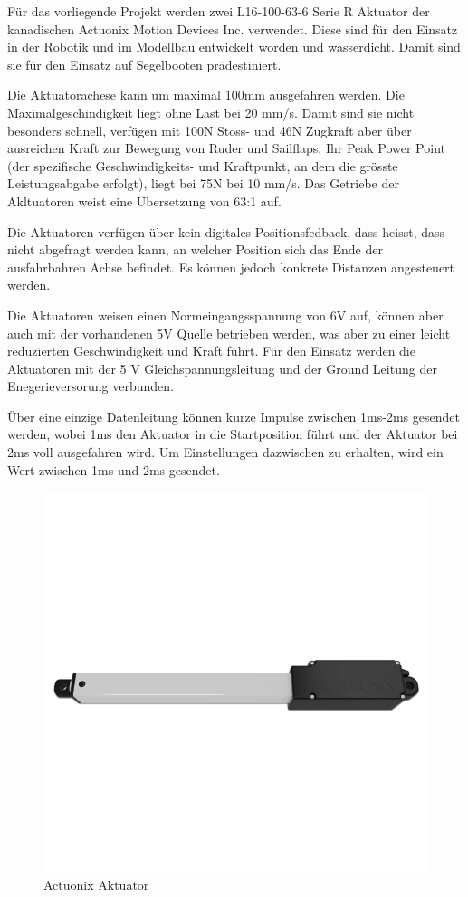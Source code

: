 Für das vorliegende Projekt werden zwei L16-100-63-6 Serie R Aktuator der kanadischen Actuonix Motion Devices Inc. verwendet. Diese sind für den Einsatz in der Robotik und im Modellbau entwickelt worden und wasserdicht. Damit sind  sie für den Einsatz  auf Segelbooten prädestiniert. 

Die Aktuatorachese kann um maximal 100mm ausgefahren werden. Die Maximalgeschindigkeit liegt ohne Last bei 20 mm/s. Damit sind sie nicht besonders schnell, verfügen mit 100N Stoss- und 46N Zugkraft aber über ausreichen Kraft zur Bewegung von Ruder und Sailflaps. Ihr Peak Power Point (der spezifische Geschwindigkeits- und Kraftpunkt, an dem die grösste Leistungsabgabe erfolgt), liegt bei 75N bei 10 mm/s. Das Getriebe der Akltuatoren weist eine Übersetzung von 63:1 auf. 

Die Aktuatoren verfügen über kein digitales Positionsfedback, dass heisst, dass nicht abgefragt werden kann, an welcher Position sich das Ende der ausfahrbahren Achse befindet. Es können jedoch konkrete Distanzen angesteuert werden. 

Die Aktuatoren weisen einen Normeingangsspannung von 6V auf, können aber auch mit der vorhandenen 5V Quelle betrieben werden, was aber zu einer leicht reduzierten Geschwindigkeit und Kraft führt. Für den Einsatz werden die Aktuatoren mit der  5 V Gleichspannungsleitung und der Ground Leitung der Enegerieversorung   verbunden. 

Über eine einzige Datenleitung  können kurze Impulse zwischen 1ms-2ms gesendet werden, wobei 1ms den Aktuator in die Startposition führt und der Aktuator bei 2ms voll ausgefahren wird. Um Einstellungen dazwischen zu erhalten, wird ein Wert zwischen 1ms und 2ms gesendet. 

\begin{figure}[H] 
    \centering
    \includegraphics[width=0.5\linewidth]{actuonix.png}
    \caption{Actuonix Aktuator}
    \label{fig:actuator}
\end{figure}

